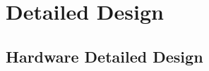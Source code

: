 \documentclass[11pt,a4paper]{article}
\begin{document}
\section{Detailed Design}

\subsection{Hardware Detailed Design}
\end{document}
